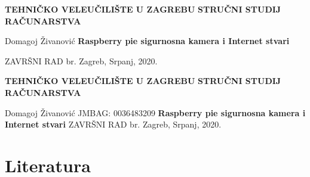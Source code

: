 \documentclass[12pt,a4paper]{article}
\date{}
\newcommand{\collegeName}{TEHNIČKO VELEUČILIŠTE U ZAGREBU}
\newcommand{\smjer}{STRUČNI STUDIJ RAČUNARSTVA}
\newcommand{\radTittle}{Raspberry pie sigurnosna kamera i Internet stvari}
\newcommand{\radNumber}{}
\begin{document}
\begin{center} \obeylines
  {\large \textbf{\collegeName}}
  {\normalsize \textbf{\smjer}}
\end{center}
\begin{center} \obeylines
  \vspace{\fill}
    Domagoj Živanović 
    {\Large \textbf{\radTittle}}
    \item ZAVRŠNI RAD br. \radNumber
  \vspace*{\fill}
  Zagreb, Srpanj, 2020.
\end{center}

\thispagestyle{empty}

\clearpage

\begin{center} \obeylines
  {\large \textbf{\collegeName}}
  {\normalsize \textbf{\smjer}}
\end{center}
\begin{center} \obeylines
  \vspace{\fill}
      Domagoj Živanović
      JMBAG: 0036483209
    {\Large \textbf{\radTittle}}
    ZAVRŠNI RAD br. \radNumber
  \vspace*{\fill}
  Zagreb, Srpanj, 2020.
\end{center}

\thispagestyle{empty}

\clearpage


\tableofcontents
\clearpage

\listoftables
\listoffigures







\section{Literatura}
\printbibliography[heading=none]
\end{document}
